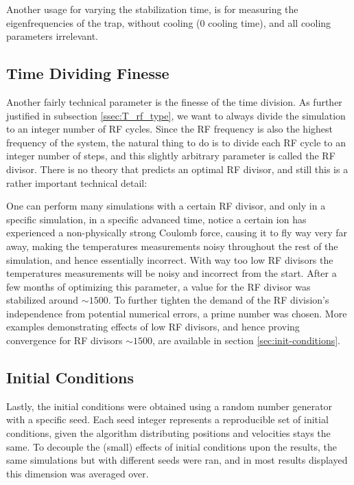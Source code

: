 \label{TODO1}

Another usage for varying the stabilization time, is for measuring the eigenfrequencies of the trap, without cooling ($0$ cooling time), and all cooling parameters irrelevant.

\subsection{Time Dividing Finesse}

Another fairly technical parameter is the finesse of the time division. As further justified in subsection \ref{ssec:T_rf_type}, we want to always divide the simulation to an integer number of RF cycles. Since the RF frequency is also the highest frequency of the system, the natural thing to do is to divide each RF cycle to an integer number of steps, and this slightly arbitrary parameter is called the RF divisor. There is no theory that predicts an optimal RF divisor, and still this is a rather important technical detail:

One can perform many simulations with a certain RF divisor, and only in a specific simulation, in a specific advanced time, notice a certain ion has experienced a non-physically strong Coulomb force, causing it to fly way very far away, making the temperatures measurements noisy throughout the rest of the simulation, and hence essentially incorrect. With way too low RF divisors the temperatures measurements will be noisy and incorrect from the start. After a few months of optimizing this parameter, a value for the RF divisor was stabilized around $\sim 1500$. To further tighten the demand of the RF division's independence from potential numerical errors, a prime number was chosen.\cite{primesieve} More examples demonstrating effects of low RF divisors, and hence proving convergence for RF divisors $\sim 1500$, are available in section \ref{sec:init-conditions}.

\subsection{Initial Conditions}

Lastly, the initial conditions were obtained using a random number generator with a specific seed. Each seed integer represents a reproducible set of initial conditions, given the algorithm distributing positions and velocities stays the same. To decouple the (small) effects of initial conditions upon the results, the same simulations but with different seeds were ran, and in most results displayed this dimension was averaged over.

